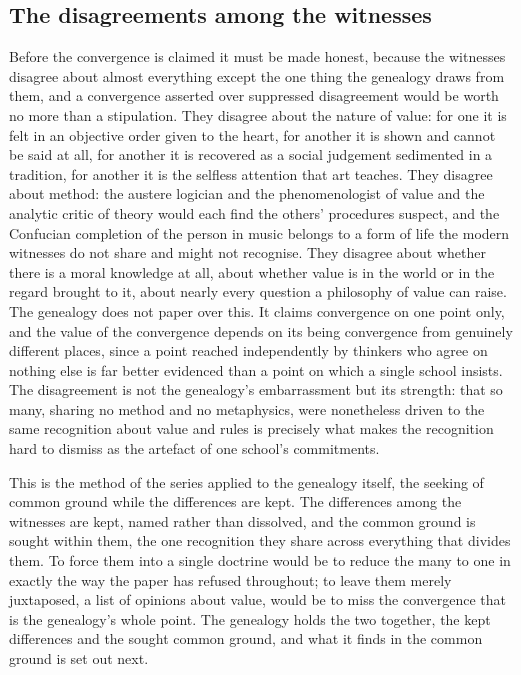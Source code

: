 \subsection{The disagreements among the witnesses}
\label{p22:sub:gen-disagreement}

Before the convergence is claimed it must be made honest, because the witnesses disagree about almost everything except the one thing the genealogy draws from them, and a convergence asserted over suppressed disagreement would be worth no more than a stipulation. They disagree about the nature of value: for one it is felt in an objective order given to the heart, for another it is shown and cannot be said at all, for another it is recovered as a social judgement sedimented in a tradition, for another it is the selfless attention that art teaches. They disagree about method: the austere logician and the phenomenologist of value and the analytic critic of theory would each find the others' procedures suspect, and the Confucian completion of the person in music belongs to a form of life the modern witnesses do not share and might not recognise. They disagree about whether there is a moral knowledge at all, about whether value is in the world or in the regard brought to it, about nearly every question a philosophy of value can raise. The genealogy does not paper over this. It claims convergence on one point only, and the value of the convergence depends on its being convergence from genuinely different places, since a point reached independently by thinkers who agree on nothing else is far better evidenced than a point on which a single school insists. The disagreement is not the genealogy's embarrassment but its strength: that so many, sharing no method and no metaphysics, were nonetheless driven to the same recognition about value and rules is precisely what makes the recognition hard to dismiss as the artefact of one school's commitments.

This is the method of the series applied to the genealogy itself, the seeking of common ground while the differences are kept. The differences among the witnesses are kept, named rather than dissolved, and the common ground is sought within them, the one recognition they share across everything that divides them. To force them into a single doctrine would be to reduce the many to one in exactly the way the paper has refused throughout; to leave them merely juxtaposed, a list of opinions about value, would be to miss the convergence that is the genealogy's whole point. The genealogy holds the two together, the kept differences and the sought common ground, and what it finds in the common ground is set out next.


